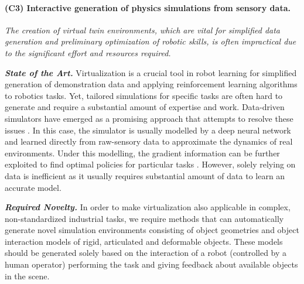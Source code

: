 \documentclass{erc-B2}
\begin{document}

\paragraph{(C3) Interactive generation of physics simulations from sensory data.} 
\textit{The creation of virtual twin environments, which are vital for simplified data generation and preliminary optimization of robotic skills, is often impractical due to the significant effort and resources required.}

\textit{\textbf{State of the Art.}}
Virtualization is a crucial tool in robot learning for simplified generation of demonstration data  \cite{jiang2023user, mandlekar2018roboturk} and applying reinforcement learning algorithms \cite{Das_Bechtle_Davchev_Jayaraman_Rai_Meier_2021} to robotics tasks. Yet, tailored simulations for specific tasks are often hard to generate and require a substantial amount of expertise and work. Data-driven simulators have emerged as a promising approach that attempts to resolve these issues \cite{pfaff2021learning, sundaresan2022diffcloud, kandukuri2022physical}. In this case, the simulator is usually modelled by a deep neural network and learned directly from raw-sensory data to approximate the dynamics of real environments. Under this modelling, the gradient information can be further exploited to find optimal policies for particular tasks \cite{Hu2020DiffTaichi:, xu2022accelerated}. However, solely relying on data is inefficient as it usually requires substantial amount of data to learn an accurate model.



\textit{\textbf{Required Novelty.}} In order to make virtualization also applicable in complex, non-standardized industrial tasks, we require methods that can automatically generate novel simulation environments consisting of object geometries and object interaction models of rigid, articulated and deformable objects. These models should be generated solely based on the interaction of a robot (controlled by a human operator) performing the task and giving feedback about available objects in the scene. 
\end{document}

